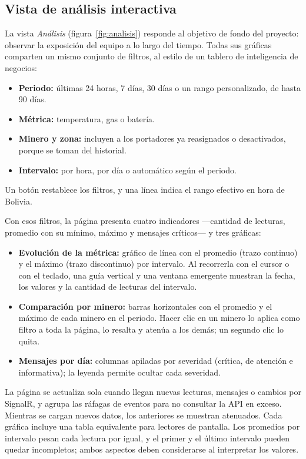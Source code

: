\documentclass[10pt,a4paper]{article}
\begin{document}
\subsection{Vista de análisis interactiva}
\label{sec:analisis}
La vista \emph{Análisis} (figura~\ref{fig:analisis}) responde al objetivo de fondo del proyecto: observar la exposición del equipo a lo largo del tiempo. Todas sus gráficas comparten un mismo conjunto de filtros, al estilo de un tablero de inteligencia de negocios:
\begin{itemize}
\item \textbf{Periodo:} últimas 24 horas, 7 días, 30 días o un rango personalizado, de hasta 90 días.
\item \textbf{Métrica:} temperatura, gas o batería.
\item \textbf{Minero y zona:} incluyen a los portadores ya reasignados o desactivados, porque se toman del historial.
\item \textbf{Intervalo:} por hora, por día o automático según el periodo.
\end{itemize}
Un botón restablece los filtros, y una línea indica el rango efectivo en hora de Bolivia.

Con esos filtros, la página presenta cuatro indicadores —cantidad de lecturas, promedio con su mínimo, máximo y mensajes críticos— y tres gráficas:
\begin{itemize}
\item \textbf{Evolución de la métrica:} gráfico de línea con el promedio (trazo continuo) y el máximo (trazo discontinuo) por intervalo. Al recorrerla con el cursor o con el teclado, una guía vertical y una ventana emergente muestran la fecha, los valores y la cantidad de lecturas del intervalo.
\item \textbf{Comparación por minero:} barras horizontales con el promedio y el máximo de cada minero en el periodo. Hacer clic en un minero lo aplica como filtro a toda la página, lo resalta y atenúa a los demás; un segundo clic lo quita.
\item \textbf{Mensajes por día:} columnas apiladas por severidad (crítica, de atención e informativa); la leyenda permite ocultar cada severidad.
\end{itemize}

La página se actualiza sola cuando llegan nuevas lecturas, mensajes o cambios por SignalR, y agrupa las ráfagas de eventos para no consultar la API en exceso. Mientras se cargan nuevos datos, los anteriores se muestran atenuados. Cada gráfica incluye una tabla equivalente para lectores de pantalla. Los promedios por intervalo pesan cada lectura por igual, y el primer y el último intervalo pueden quedar incompletos; ambos aspectos deben considerarse al interpretar los valores.
\end{document}
